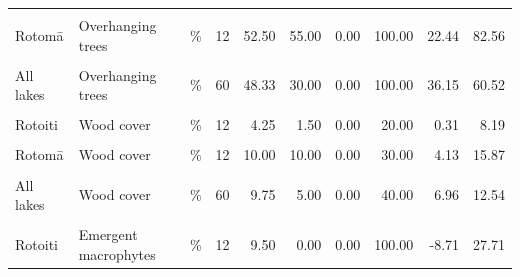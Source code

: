 \documentclass[
  12pt,
  a4paper,
  oneside]{scrbook}
\begin{document}
\begin{longtable}[t]{lllrrrrrrr}
\addlinespace
\cellcolor{gray!8}{Rotoehu} & \cellcolor{gray!8}{Overhanging trees} & \cellcolor{gray!8}{\%} & \cellcolor{gray!8}{12} & \cellcolor{gray!8}{35.83} & \cellcolor{gray!8}{0.00} & \cellcolor{gray!8}{0.00} & \cellcolor{gray!8}{100.00} & \cellcolor{gray!8}{5.25} & \cellcolor{gray!8}{66.42}\\
Rotomā & Overhanging trees & \% & 12 & 52.50 & 55.00 & 0.00 & 100.00 & 22.44 & 82.56\\
\cellcolor{gray!8}{Ōkāreka} & \cellcolor{gray!8}{Overhanging trees} & \cellcolor{gray!8}{\%} & \cellcolor{gray!8}{12} & \cellcolor{gray!8}{52.50} & \cellcolor{gray!8}{65.00} & \cellcolor{gray!8}{0.00} & \cellcolor{gray!8}{100.00} & \cellcolor{gray!8}{21.71} & \cellcolor{gray!8}{83.29}\\
All lakes & Overhanging trees & \% & 60 & 48.33 & 30.00 & 0.00 & 100.00 & 36.15 & 60.52\\
\cellcolor{gray!8}{Rotorua} & \cellcolor{gray!8}{Wood cover} & \cellcolor{gray!8}{\%} & \cellcolor{gray!8}{12} & \cellcolor{gray!8}{8.33} & \cellcolor{gray!8}{3.50} & \cellcolor{gray!8}{0.00} & \cellcolor{gray!8}{30.00} & \cellcolor{gray!8}{1.98} & \cellcolor{gray!8}{14.69}\\
\addlinespace
Rotoiti & Wood cover & \% & 12 & 4.25 & 1.50 & 0.00 & 20.00 & 0.31 & 8.19\\
\cellcolor{gray!8}{Rotoehu} & \cellcolor{gray!8}{Wood cover} & \cellcolor{gray!8}{\%} & \cellcolor{gray!8}{12} & \cellcolor{gray!8}{14.92} & \cellcolor{gray!8}{10.00} & \cellcolor{gray!8}{3.00} & \cellcolor{gray!8}{40.00} & \cellcolor{gray!8}{7.24} & \cellcolor{gray!8}{22.60}\\
Rotomā & Wood cover & \% & 12 & 10.00 & 10.00 & 0.00 & 30.00 & 4.13 & 15.87\\
\cellcolor{gray!8}{Ōkāreka} & \cellcolor{gray!8}{Wood cover} & \cellcolor{gray!8}{\%} & \cellcolor{gray!8}{12} & \cellcolor{gray!8}{11.25} & \cellcolor{gray!8}{7.50} & \cellcolor{gray!8}{0.00} & \cellcolor{gray!8}{40.00} & \cellcolor{gray!8}{2.56} & \cellcolor{gray!8}{19.94}\\
All lakes & Wood cover & \% & 60 & 9.75 & 5.00 & 0.00 & 40.00 & 6.96 & 12.54\\
\addlinespace
\cellcolor{gray!8}{Rotorua} & \cellcolor{gray!8}{Emergent macrophytes} & \cellcolor{gray!8}{\%} & \cellcolor{gray!8}{12} & \cellcolor{gray!8}{0.00} & \cellcolor{gray!8}{0.00} & \cellcolor{gray!8}{0.00} & \cellcolor{gray!8}{0.00} & \cellcolor{gray!8}{0.00} & \cellcolor{gray!8}{0.00}\\
Rotoiti & Emergent macrophytes & \% & 12 & 9.50 & 0.00 & 0.00 & 100.00 & -8.71 & 27.71\\

\end{longtable}
\end{document}
